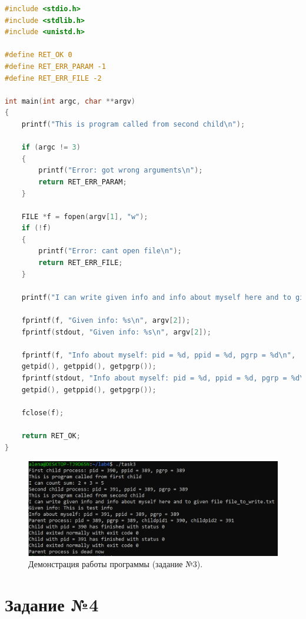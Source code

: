 \documentclass[12pt]{report}
\begin{document}
\begin{lstlisting}[label=some-code,caption=Код вызываемой из второго потомка программы,language=C]
#include <stdio.h>
#include <stdlib.h>
#include <unistd.h>

#define RET_OK 0
#define RET_ERR_PARAM -1
#define RET_ERR_FILE -2

int main(int argc, char **argv)
{
	printf("This is program called from second child\n");
	
	if (argc != 3)
	{
		printf("Error: got wrong arguments\n");
		return RET_ERR_PARAM;
	}
	
	FILE *f = fopen(argv[1], "w");
	if (!f)
	{
		printf("Error: cant open file\n");
		return RET_ERR_FILE;
	}
	
	printf("I can write given info and info about myself here and to given file %s\n", argv[1]);
	
	fprintf(f, "Given info: %s\n", argv[2]);
	fprintf(stdout, "Given info: %s\n", argv[2]);
	
	fprintf(f, "Info about myself: pid = %d, ppid = %d, pgrp = %d\n", 
	getpid(), getppid(), getpgrp());
	fprintf(stdout, "Info about myself: pid = %d, ppid = %d, pgrp = %d\n", 
	getpid(), getppid(), getpgrp());
	
	fclose(f);
	
	return RET_OK;
}
\end{lstlisting}


\begin{figure}[H]

	\centering

	\includegraphics[width=\linewidth]{img/task03.png}
	\caption{Демонстрация работы программы (задание №3).}

	\label{fig:task03}

\end{figure}



\section*{Задание №4}
\end{document}
